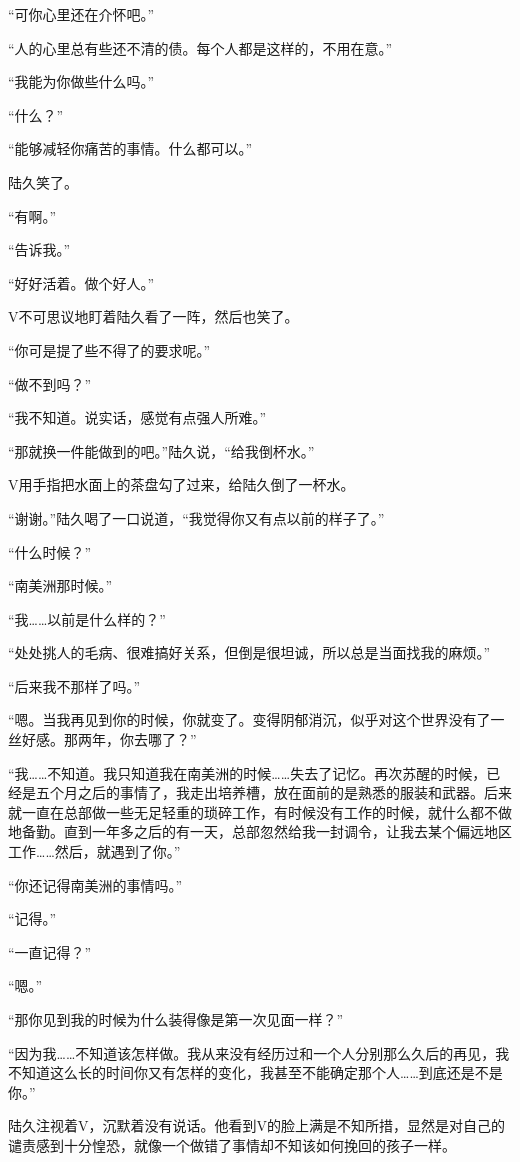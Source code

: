 “可你心里还在介怀吧。”

“人的心里总有些还不清的债。每个人都是这样的，不用在意。”

“我能为你做些什么吗。”

“什么？”

“能够减轻你痛苦的事情。什么都可以。”

陆久笑了。

“有啊。”

“告诉我。”

“好好活着。做个好人。”

V不可思议地盯着陆久看了一阵，然后也笑了。

“你可是提了些不得了的要求呢。”

“做不到吗？”

“我不知道。说实话，感觉有点强人所难。”

“那就换一件能做到的吧。”陆久说，“给我倒杯水。”

V用手指把水面上的茶盘勾了过来，给陆久倒了一杯水。

“谢谢。”陆久喝了一口说道，“我觉得你又有点以前的样子了。”

“什么时候？”

“南美洲那时候。”

“我……以前是什么样的？”

“处处挑人的毛病、很难搞好关系，但倒是很坦诚，所以总是当面找我的麻烦。”

“后来我不那样了吗。”

“嗯。当我再见到你的时候，你就变了。变得阴郁消沉，似乎对这个世界没有了一丝好感。那两年，你去哪了？”

“我……不知道。我只知道我在南美洲的时候……失去了记忆。再次苏醒的时候，已经是五个月之后的事情了，我走出培养槽，放在面前的是熟悉的服装和武器。后来就一直在总部做一些无足轻重的琐碎工作，有时候没有工作的时候，就什么都不做地备勤。直到一年多之后的有一天，总部忽然给我一封调令，让我去某个偏远地区工作……然后，就遇到了你。”

“你还记得南美洲的事情吗。”

“记得。”

“一直记得？”

“嗯。”

“那你见到我的时候为什么装得像是第一次见面一样？”

“因为我……不知道该怎样做。我从来没有经历过和一个人分别那么久后的再见，我不知道这么长的时间你又有怎样的变化，我甚至不能确定那个人……到底还是不是你。”

陆久注视着V，沉默着没有说话。他看到V的脸上满是不知所措，显然是对自己的谴责感到十分惶恐，就像一个做错了事情却不知该如何挽回的孩子一样。

